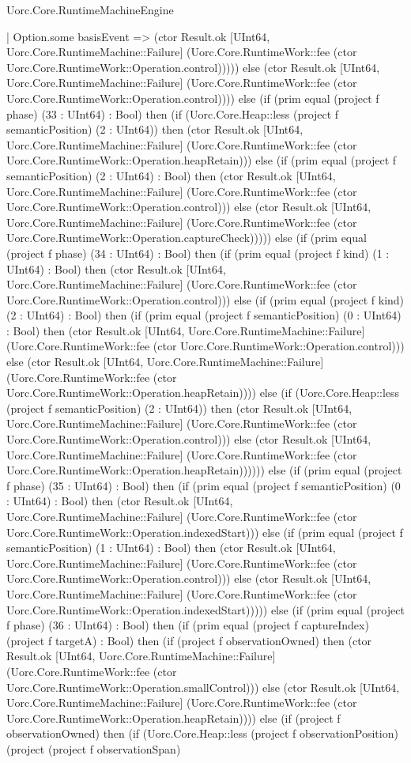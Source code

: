 \begin{lexlean}{Uorc.Core.RuntimeMachineEngine}
\begin{semanticmodule}
{        | Option.some basisEvent => (ctor Result.ok [UInt64, Uorc.Core.RuntimeMachine::Failure] (Uorc.Core.RuntimeWork::fee (ctor Uorc.Core.RuntimeWork::Operation.control))))) else (ctor Result.ok [UInt64, Uorc.Core.RuntimeMachine::Failure] (Uorc.Core.RuntimeWork::fee (ctor Uorc.Core.RuntimeWork::Operation.control)))) else (if (prim equal (project f phase) (33 : UInt64) : Bool) then (if (Uorc.Core.Heap::less (project f semanticPosition) (2 : UInt64)) then (ctor Result.ok [UInt64, Uorc.Core.RuntimeMachine::Failure] (Uorc.Core.RuntimeWork::fee (ctor Uorc.Core.RuntimeWork::Operation.heapRetain))) else (if (prim equal (project f semanticPosition) (2 : UInt64) : Bool) then (ctor Result.ok [UInt64, Uorc.Core.RuntimeMachine::Failure] (Uorc.Core.RuntimeWork::fee (ctor Uorc.Core.RuntimeWork::Operation.control))) else (ctor Result.ok [UInt64, Uorc.Core.RuntimeMachine::Failure] (Uorc.Core.RuntimeWork::fee (ctor Uorc.Core.RuntimeWork::Operation.captureCheck))))) else (if (prim equal (project f phase) (34 : UInt64) : Bool) then (if (prim equal (project f kind) (1 : UInt64) : Bool) then (ctor Result.ok [UInt64, Uorc.Core.RuntimeMachine::Failure] (Uorc.Core.RuntimeWork::fee (ctor Uorc.Core.RuntimeWork::Operation.control))) else (if (prim equal (project f kind) (2 : UInt64) : Bool) then (if (prim equal (project f semanticPosition) (0 : UInt64) : Bool) then (ctor Result.ok [UInt64, Uorc.Core.RuntimeMachine::Failure] (Uorc.Core.RuntimeWork::fee (ctor Uorc.Core.RuntimeWork::Operation.control))) else (ctor Result.ok [UInt64, Uorc.Core.RuntimeMachine::Failure] (Uorc.Core.RuntimeWork::fee (ctor Uorc.Core.RuntimeWork::Operation.heapRetain)))) else (if (Uorc.Core.Heap::less (project f semanticPosition) (2 : UInt64)) then (ctor Result.ok [UInt64, Uorc.Core.RuntimeMachine::Failure] (Uorc.Core.RuntimeWork::fee (ctor Uorc.Core.RuntimeWork::Operation.control))) else (ctor Result.ok [UInt64, Uorc.Core.RuntimeMachine::Failure] (Uorc.Core.RuntimeWork::fee (ctor Uorc.Core.RuntimeWork::Operation.heapRetain)))))) else (if (prim equal (project f phase) (35 : UInt64) : Bool) then (if (prim equal (project f semanticPosition) (0 : UInt64) : Bool) then (ctor Result.ok [UInt64, Uorc.Core.RuntimeMachine::Failure] (Uorc.Core.RuntimeWork::fee (ctor Uorc.Core.RuntimeWork::Operation.indexedStart))) else (if (prim equal (project f semanticPosition) (1 : UInt64) : Bool) then (ctor Result.ok [UInt64, Uorc.Core.RuntimeMachine::Failure] (Uorc.Core.RuntimeWork::fee (ctor Uorc.Core.RuntimeWork::Operation.control))) else (ctor Result.ok [UInt64, Uorc.Core.RuntimeMachine::Failure] (Uorc.Core.RuntimeWork::fee (ctor Uorc.Core.RuntimeWork::Operation.indexedStart))))) else (if (prim equal (project f phase) (36 : UInt64) : Bool) then (if (prim equal (project f captureIndex) (project f targetA) : Bool) then (if (project f observationOwned) then (ctor Result.ok [UInt64, Uorc.Core.RuntimeMachine::Failure] (Uorc.Core.RuntimeWork::fee (ctor Uorc.Core.RuntimeWork::Operation.smallControl))) else (ctor Result.ok [UInt64, Uorc.Core.RuntimeMachine::Failure] (Uorc.Core.RuntimeWork::fee (ctor Uorc.Core.RuntimeWork::Operation.heapRetain)))) else (if (project f observationOwned) then (if (Uorc.Core.Heap::less (project f observationPosition) (project (project f observationSpan) }
\end{semanticmodule}
\end{lexlean}
